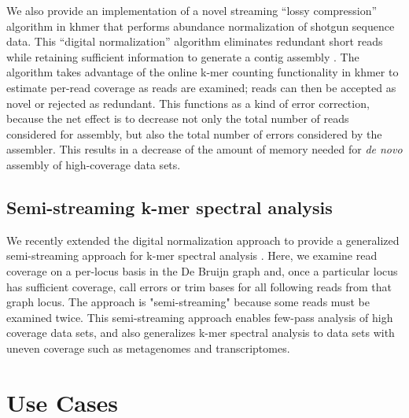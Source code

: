 \documentclass[10pt,a4paper,twocolumn]{article}
\begin{document}
We also provide an implementation of a novel streaming ``lossy compression'' algorithm in
khmer that performs abundance normalization of shotgun sequence data.
This ``digital normalization'' algorithm eliminates redundant
short reads while retaining sufficient information to generate a
contig assembly \cite{Brown2012}.  The algorithm takes advantage of the online
k-mer counting functionality in khmer to estimate per-read coverage as
reads are examined; reads can then be accepted as novel or rejected as
redundant. This functions as a kind of error correction, because the
net effect is to decrease not only the total number of reads considered
for assembly, but also the total number of errors considered
by the assembler.  This results in a decrease of the
amount of memory needed for {\em de novo} assembly of high-coverage data sets.

\subsection*{Semi-streaming k-mer spectral analysis}

We recently extended the digital normalization approach to provide a generalized semi-streaming approach for k-mer spectral analysis \cite{zhang2015crossing}. Here, we examine read coverage on a per-locus basis in the De Bruijn graph and, once a particular locus has sufficient coverage, call errors or trim bases for all following reads from that graph locus.  The approach is "semi-streaming" \cite{semi-streaming} because some reads must be examined twice.  This semi-streaming approach enables few-pass analysis of high coverage data sets, and also generalizes k-mer spectral analysis to data sets with uneven coverage such as metagenomes and transcriptomes.


\section*{Use Cases} %
\end{document}
